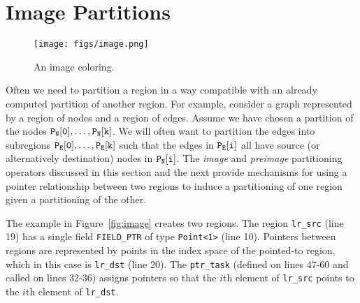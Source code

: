 \begin{figure}
  
  \caption{}
  \label{fig:sets}
\end{figure}


\section{Image Partitions}
\label{sec:image}

\begin{figure}
  \centering
  \texttt{[image: figs/image.png]}
  \caption{An image coloring.}
  \label{fig:eximage}
\end{figure}

  
Often we need to partition a region in a way compatible with an already computed partition of another region.
For example, consider a graph represented by a region of nodes and a region of edges. Assume we have chosen a partition of the nodes $\tt P_N[0],\ldots,P_N[k]$.
We will often want to partition the edges into subregions $\tt P_E[0],\ldots,P_E[k]$ such that the edges in $\tt P_E[i]$ all have source (or alternatively destination) nodes in $\tt P_N[i]$.  The {\em image} and {\em preimage} partitioning operators discussed in this section and the next provide mechanisms for using a pointer relationship between
two regions to induce a partitioning of one region given a partitioning of the other.

The example in Figure~\ref{fig:image} creates two regions.  The region {\tt lr\_src} (line 19) has a single field {\tt FIELD\_PTR} of type \verb+Point<1>+ (line 10).  Pointers
between regions are represented by points in the index space of the pointed-to region, which in this case is {\tt lr\_dst} (line 20).  The {\tt ptr\_task} (defined on lines 47-60 and called on lines 32-36) assigns pointers so that the $i$th element of {\tt lr\_src} points to the $i$th element of {\tt lr\_dst}.

